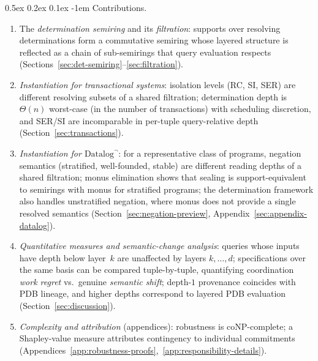 \documentclass[acmsmall,review,anonymous]{acmart}
\makeatletter
\renewcommand{\paragraph}{\@startsection{paragraph}{4}{\z@}%
  {0.5ex \@plus 0.2ex \@minus 0.1ex}%
  {-1em}%
  {\normalfont\normalsize\bfseries}}
\theoremstyle{remark}
\numberwithin{definition}{section}
\numberwithin{theorem}{section}
\numberwithin{lemma}{section}
\numberwithin{corollary}{section}
\numberwithin{remark}{section}
\numberwithin{example}{section}
\numberwithin{observation}{section}
\numberwithin{assumption}{section}
\makeatother
\begin{document}
\paragraph{Contributions.}
\begin{enumerate}[label=(\roman*),nosep,leftmargin=*]
  \item The \emph{determination semiring} and its \emph{filtration}:
        supports over resolving determinations form a commutative
        semiring whose layered structure is reflected as a chain of
        sub-semirings that query evaluation respects
        (Sections~\ref{sec:det-semiring}--\ref{sec:filtration}).
  \item \emph{Instantiation for transactional systems}: isolation levels
        (RC, SI, SER) are different resolving subsets of a shared
        filtration; determination depth is $\Theta(n)$ worst-case
        (in the number of transactions) with scheduling discretion, and SER/SI are incomparable in
        per-tuple query-relative depth
        (Section~\ref{sec:transactions}).
  \item \emph{Instantiation for $\mbox{Datalog}^\neg$}: for a representative
        class of programs, negation semantics (stratified,
        well-founded, stable) are different reading depths of a shared
        filtration; monus elimination shows that sealing is
        support-equivalent to semirings with monus for stratified
        programs; the determination framework also handles unstratified
        negation, where monus does not provide a single resolved
        semantics
        (Section~\ref{sec:negation-preview},
        Appendix~\ref{sec:appendix-datalog}).
  \item \emph{Quantitative measures and semantic-change analysis}:
        queries whose inputs have depth below layer~$k$ are unaffected
        by layers $k, \ldots, d$; specifications over the same basis can be
        compared tuple-by-tuple, quantifying coordination \emph{work
        regret} vs.\ genuine \emph{semantic shift}; depth-$1$
        provenance coincides with PDB lineage, and higher depths
        correspond to layered PDB evaluation
        (Section~\ref{sec:discussion}).
  \item \emph{Complexity and attribution} (appendices):
        robustness is coNP-complete; a
        Shapley-value measure attributes contingency to individual
        commitments (Appendices~\ref{app:robustness-proofs},~\ref{app:responsibility-details}).
\end{enumerate}
\end{document}
